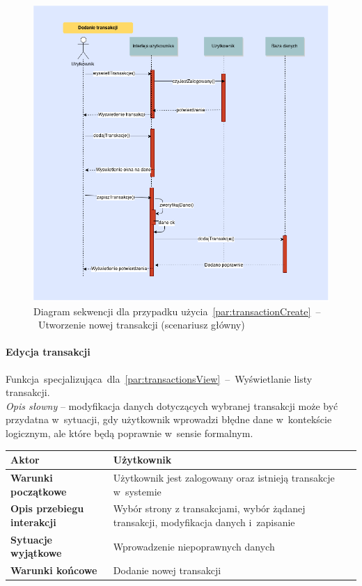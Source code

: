 \begin{figure}[H]
  \includegraphics[width=\textwidth]{images/dodanie_transakcji.png}
  \caption{Diagram sekwencji dla przypadku użycia~\ref{par:transactionCreate}~--~Utworzenie nowej transakcji (scenariusz główny)}
\end{figure}

\paragraph{Edycja transakcji\newline}
\label{par:transactionEdit}
Funkcja~specjalizująca~dla~\ref{par:transactionsView}~--~Wyświetlanie listy transakcji.\\

\textit{Opis słowny} -- modyfikacja danych dotyczących wybranej transakcji może być przydatna w~sytuacji, gdy użytkownik wprowadzi błędne dane w~kontekście logicznym, ale które będą poprawnie w~sensie formalnym.

\begin{longtable}{|p{5cm}|p{7cm}|}
  \hline \textbf{Aktor} & Użytkownik \\
  \hline \textbf{Warunki początkowe} & Użytkownik jest zalogowany oraz istnieją transakcje w~systemie \\
  \hline \textbf{Opis przebiegu interakcji} & Wybór strony z transakcjami, wybór żądanej transakcji, modyfikacja danych i~zapisanie \\
  \hline \textbf{Sytuacje wyjątkowe} & Wprowadzenie niepoprawnych danych \\
  \hline \textbf{Warunki końcowe} & Dodanie nowej transakcji \\
  \hline
\end{longtable}

